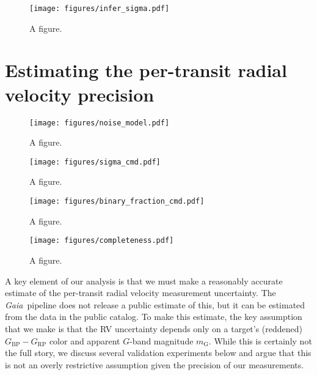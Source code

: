 \documentclass[modern, letterpaper]{aastex631}
\newcommand{\project}[1]{\textsl{#1}}
\newcommand{\Gaia}{\project{Gaia}}
\begin{document}
\begin{figure}
	\begin{centering}
		\texttt{[image: figures/infer\_sigma.pdf]}
		\caption{A figure.}
		\label{fig:infer_sigma:results}
	\end{centering}
\end{figure}

\section{Estimating the per-transit radial velocity precision}\label{sec:noise}

\begin{figure}
	\begin{centering}
		\texttt{[image: figures/noise\_model.pdf]}
		\caption{A figure.}
		\label{fig:noise_model}
	\end{centering}
\end{figure}

\begin{figure}
	\begin{centering}
		\texttt{[image: figures/sigma\_cmd.pdf]}
		\caption{A figure.}
		\label{fig:sigma_cmd}
	\end{centering}
\end{figure}

\begin{figure}
	\begin{centering}
		\texttt{[image: figures/binary\_fraction\_cmd.pdf]}
		\caption{A figure.}
		\label{fig:binary_fraction_cmd}
	\end{centering}
\end{figure}

\begin{figure}
	\begin{centering}
		\texttt{[image: figures/completeness.pdf]}
		\caption{A figure.}
		\label{fig:completeness}
	\end{centering}
\end{figure}


A key element of our analysis is that we must make a reasonably accurate estimate of the per-transit radial velocity measurement uncertainty.
The \Gaia\ pipeline does not release a public estimate of this, but it can be estimated from the data in the public catalog.
To make this estimate, the key assumption that we make is that the RV uncertainty depends only on a target's (reddened) $G_\mathrm{BP} - G_\mathrm{RP}$ color and apparent $G$-band magnitude $m_\mathrm{G}$.
While this is certainly not the full story, we discuss several validation experiments below and argue that this is not an overly restrictive assumption given the precision of our measurements.
\end{document}
